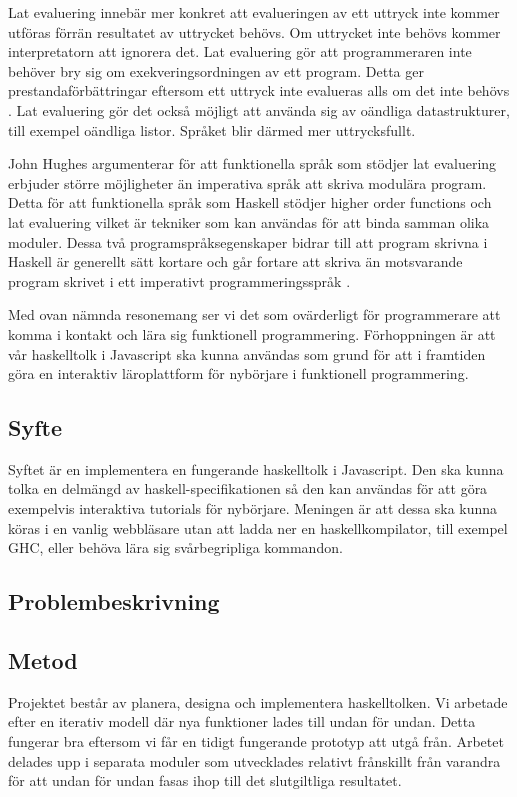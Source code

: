 Lat evaluering innebär mer konkret att evalueringen av ett uttryck inte kommer utföras förrän resultatet av uttrycket behövs. Om uttrycket inte behövs  kommer interpretatorn att ignorera det. 
Lat evaluering gör att programmeraren inte behöver bry sig om exekveringsordningen av ett program. Detta ger prestandaförbättringar eftersom ett uttryck inte evalueras alls om det inte behövs \citep{hudak89}.
Lat evaluering gör det också möjligt att använda sig av oändliga datastrukturer, till exempel oändliga listor. Språket blir därmed mer uttrycksfullt. 

John Hughes argumenterar för att  funktionella språk som stödjer lat evaluering erbjuder större möjligheter än imperativa språk att skriva modulära program. Detta för att funktionella språk som Haskell stödjer higher order functions och lat evaluering vilket är tekniker som kan användas för att binda samman olika moduler.
Dessa två programspråksegenskaper bidrar till att program skrivna i Haskell är generellt sätt kortare och går fortare att skriva än motsvarande program skrivet i ett imperativt programmeringsspråk  \citep{why}.

Med ovan nämnda resonemang ser vi det som ovärderligt för programmerare att komma i kontakt och lära sig funktionell programmering. 
Förhoppningen är att vår haskelltolk i Javascript ska kunna användas som grund för att i framtiden göra en interaktiv läroplattform för nybörjare i funktionell programmering. 


\subsection{Syfte}
Syftet är en implementera en fungerande haskelltolk i Javascript. Den ska kunna tolka en delmängd av haskell-specifikationen så den kan användas för att göra exempelvis interaktiva tutorials för nybörjare.
Meningen är att dessa ska kunna köras i en vanlig webbläsare utan att ladda ner en haskellkompilator, till exempel GHC, eller behöva lära sig svårbegripliga kommandon.

\subsection{Problembeskrivning} 

\subsection{Metod}
Projektet består av planera, designa och implementera haskelltolken. Vi arbetade efter en iterativ modell där nya funktioner lades till undan för undan. Detta fungerar bra eftersom vi får en tidigt fungerande prototyp att utgå från. Arbetet delades upp i separata moduler som utvecklades relativt frånskillt från varandra för att undan för undan fasas ihop till det slutgiltliga resultatet. 

